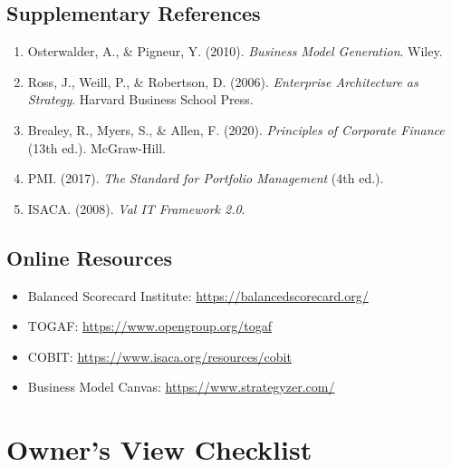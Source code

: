 \documentclass[11pt,letterpaper]{article}
\begin{document}
\subsection{Supplementary References}

\begin{enumerate}[resume]
    \item Osterwalder, A., \& Pigneur, Y. (2010). \textit{Business Model Generation}. Wiley.
    
    \item Ross, J., Weill, P., \& Robertson, D. (2006). \textit{Enterprise Architecture as Strategy}. Harvard Business School Press.
    
    \item Brealey, R., Myers, S., \& Allen, F. (2020). \textit{Principles of Corporate Finance} (13th ed.). McGraw-Hill.
    
    \item PMI. (2017). \textit{The Standard for Portfolio Management} (4th ed.).
    
    \item ISACA. (2008). \textit{Val IT Framework 2.0}.
\end{enumerate}

\subsection{Online Resources}

\begin{itemize}
    \item Balanced Scorecard Institute: \url{https://balancedscorecard.org/}
    \item TOGAF: \url{https://www.opengroup.org/togaf}
    \item COBIT: \url{https://www.isaca.org/resources/cobit}
    \item Business Model Canvas: \url{https://www.strategyzer.com/}
\end{itemize}

\appendix

\section{Owner's View Checklist}
\end{document}
